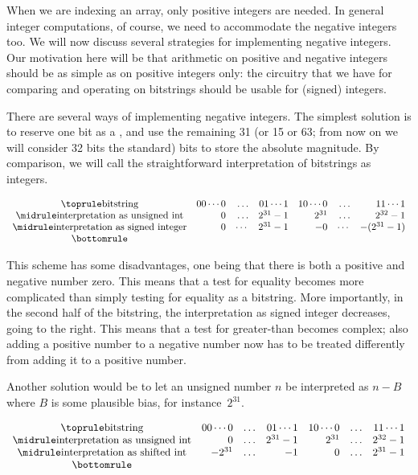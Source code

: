When we are indexing an array, only positive integers are needed.
In general integer computations, of course, we need to accommodate
the negative integers too. We will now discuss several strategies for
implementing negative integers. Our motivation here will be that
arithmetic on positive and negative integers should be as simple as on
positive integers only: the circuitry that we have for comparing and
operating on bitstrings should be usable for (signed) integers.

There are several ways of implementing
negative integers. The simplest solution is to reserve one bit as a
, and use the remaining 31 (or 15 or 63; from now on we will
consider 32 bits the standard) bits to store the
absolute magnitude. By comparison, we will call the straightforward
interpretation of bitstrings as  integers.

\begin{equation}
\begin{array}{crrrrrr}
  \toprule
  \hbox{bitstring}&
  00\cdots0&\ldots&01\cdots1&
  10\cdots0&\ldots&11\cdots1\\ \midrule
  \hbox{interpretation as unsigned int}&
  0&\ldots&2^{31}-1&
  2^{31}&\ldots&2^{32}-1\\ \midrule
  \hbox{interpretation as signed integer}&
  0&\cdots&2^{31}-1&
  -0&\cdots&-(2^{31}-1)\\
  \bottomrule
\end{array}
\end{equation}

This scheme has some disadvantages, one being that
there is both a positive and negative number zero. This means that a test
for equality becomes more complicated than simply testing for equality
as a bitstring. More importantly, in the second half of the
bitstring, the interpretation as signed integer decreases,
going to the right. This means that a test for greater-than becomes
complex; also
adding a positive number to a
negative number now has to be treated differently from adding it to a
positive number.

Another solution would be to let an unsigned number $n$ be interpreted
as $n-B$ where $B$ is some plausible bias, for instance~$2^{31}$.

\begin{equation}
\begin{array}{crrrrrr}
  \toprule
  \hbox{bitstring}&
  00\cdots0&\ldots&01\cdots1&
  10\cdots0&\ldots&11\cdots1\\ \midrule
  \hbox{interpretation as unsigned int}&
  0&\ldots&2^{31}-1&
  2^{31}&\ldots&2^{32}-1\\ \midrule
  \hbox{interpretation as shifted int}&
  -2^{31}&\ldots&-1&
  0&\ldots&2^{31}-1\\ \bottomrule
\end{array}
\end{equation}

